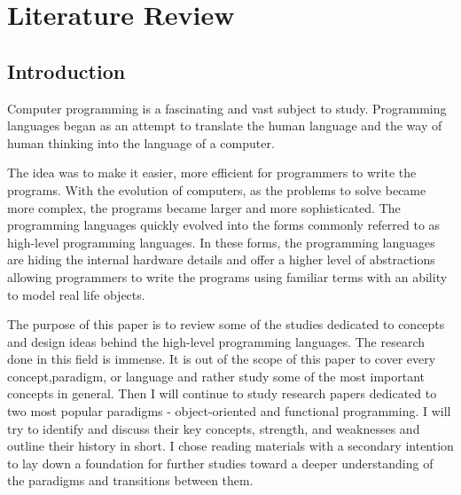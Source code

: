 \documentclass[12pt,twoside,a4paper]{report}
\begin{document}
\chapter{Literature Review}\label{2}

\section{Introduction}\label{2.1}
Computer programming is a fascinating and vast subject to study. Programming languages began as an attempt to translate the human language and the way of human thinking into the language of a computer.\par
The idea was to make it easier, more efficient for programmers to write the programs. With the evolution of computers, as the problems to solve became more complex, the programs became larger and more sophisticated. The programming languages quickly evolved into the forms commonly referred to as high-level programming languages. In these forms, the programming languages are hiding the internal hardware details and offer a higher level of abstractions allowing programmers to write the programs using familiar terms with an ability to model real life objects.\par
The purpose of this paper is to review some of the studies dedicated to concepts and design ideas behind the high-level programming languages. The research done in this field is immense. It is out of the scope of this paper to cover every concept,paradigm, or language and rather study some of the most important concepts in general. Then I will continue to study research papers dedicated to two most popular paradigms - object-oriented and functional programming. I will try to identify and discuss their key concepts, strength, and weaknesses and outline their history in short. I chose reading materials with a secondary intention to lay down a foundation for further studies toward a deeper understanding of the paradigms and transitions between them.

\end{document}
